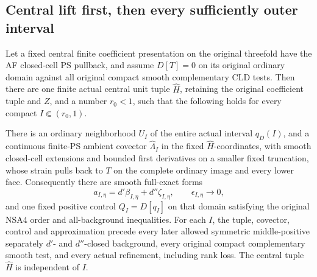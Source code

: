 \subsection{Central lift first, then every sufficiently outer interval}

\begin{theorem}
\label{thm:r13-central-compatible-punctured-collar}
Let a fixed central finite coefficient presentation on
the original threefold have the AF closed-cell PS
pullback, and assume \(D[T]=0\) on its original ordinary
domain against all original compact smooth complementary
CLD tests.  Then there are one finite actual central
unit tuple \(\widehat H\), retaining the original
coefficient tuple and \(Z\), and a number \(r_0<1\),
such that the following holds for every compact
\(I\Subset(r_0,1)\).

There is an ordinary neighborhood \(U_I\) of the
entire actual interval \(q_D(I)\), and a continuous
finite-PS ambient covector \(\widehat\Lambda_I\)
in the fixed \(\widehat H\)-coordinates, with smooth
closed-cell extensions and bounded first derivatives
on a smaller fixed truncation, whose strain pulls
back to \(T\) on the complete ordinary image and
every lower face.  Consequently there are smooth
full-exact forms
\[
       a_{I,\eta}=d'\beta_{I,\eta}+d''\zeta_{I,\eta},
              \qquad \epsilon_{I,\eta}\longrightarrow0,
\tag{UA4}
\]
and one fixed positive control \(Q_I=D[q_I]\) on
that domain satisfying the original NSA4 order and
all-background inequalities.  For each \(I\), the
tuple, covector, control and approximation precede
every later allowed symmetric middle-positive
separately \(d'\)- and \(d''\)-closed background,
every original compact complementary smooth test,
and every actual refinement, including rank loss.
The central tuple \(\widehat H\) is independent of
\(I\).
\end{theorem}

